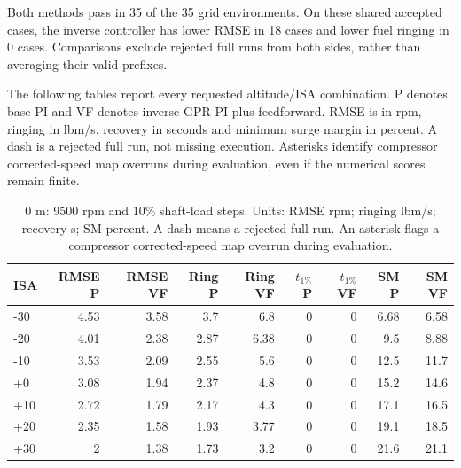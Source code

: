 \documentclass[11pt,a4paper]{article}
\begin{document}
Both methods pass in 35 of the 35 grid environments. On these shared accepted cases, the inverse controller has lower RMSE in 18 cases and lower fuel ringing in 0 cases. Comparisons exclude rejected full runs from both sides, rather than averaging their valid prefixes.

The following tables report every requested altitude/ISA combination. P denotes base PI and VF denotes inverse-GPR PI plus feedforward. RMSE is in rpm, ringing in lbm/s, recovery in seconds and minimum surge margin in percent. A dash is a rejected full run, not missing execution. Asterisks identify compressor corrected-speed map overruns during evaluation, even if the numerical scores remain finite.

\begin{table}[H]\centering\small
\setlength{\tabcolsep}{5pt}
\begin{tabular}{@{}lrrrrrrrr@{}}\toprule
ISA & RMSE P & RMSE VF & Ring P & Ring VF & $t_{1\%}$ P & $t_{1\%}$ VF & SM P & SM VF\\\midrule
-30 & 4.53 & 3.58 & 3.7 & 6.8 & 0 & 0 & 6.68 & 6.58\\
-20 & 4.01 & 2.38 & 2.87 & 6.38 & 0 & 0 & 9.5 & 8.88\\
-10 & 3.53 & 2.09 & 2.55 & 5.6 & 0 & 0 & 12.5 & 11.7\\
+0 & 3.08 & 1.94 & 2.37 & 4.8 & 0 & 0 & 15.2 & 14.6\\
+10 & 2.72 & 1.79 & 2.17 & 4.3 & 0 & 0 & 17.1 & 16.5\\
+20 & 2.35 & 1.58 & 1.93 & 3.77 & 0 & 0 & 19.1 & 18.5\\
+30 & 2 & 1.38 & 1.73 & 3.2 & 0 & 0 & 21.6 & 21.1\\
\bottomrule\end{tabular}\caption{0 m: 9500 rpm and 10\% shaft-load steps. Units: RMSE rpm; ringing lbm/s; recovery s; SM percent. A dash means a rejected full run. An asterisk flags a compressor corrected-speed map overrun during evaluation.}\end{table}
\end{document}
